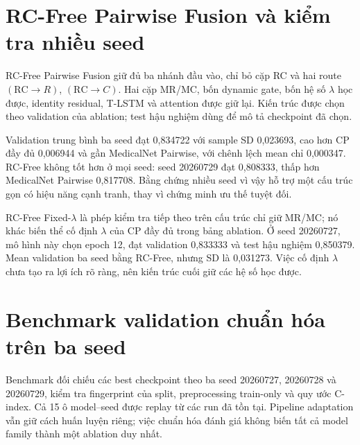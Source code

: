 \FloatBarrier
\section{RC-Free Pairwise Fusion và kiểm tra nhiều seed}
\label{sec:rcfree-multiseed}
RC-Free Pairwise Fusion giữ đủ ba nhánh đầu vào, chỉ bỏ cặp RC và hai route $(\mathrm{RC}\to R)$, $(\mathrm{RC}\to C)$. Hai cặp MR/MC, bốn dynamic gate, bốn hệ số $\lambda$ học được, identity residual, T-LSTM và attention được giữ lại. Kiến trúc được chọn theo validation của ablation; test hậu nghiệm dùng để mô tả checkpoint đã chọn.

Validation trung bình ba seed đạt 0,834722 với sample SD 0,023693, cao hơn CP đầy đủ 0,006944 và gần MedicalNet Pairwise, với chênh lệch mean chỉ 0,000347. RC-Free không tốt hơn ở mọi seed: seed 20260729 đạt 0,808333, thấp hơn MedicalNet Pairwise 0,817708. Bằng chứng nhiều seed vì vậy hỗ trợ một cấu trúc gọn có hiệu năng cạnh tranh, thay vì chứng minh ưu thế tuyệt đối.

RC-Free Fixed-$\lambda$ là phép kiểm tra tiếp theo trên cấu trúc chỉ giữ MR/MC; nó khác biến thể cố định $\lambda$ của CP đầy đủ trong bảng ablation. Ở seed 20260727, mô hình này chọn epoch 12, đạt validation 0,833333 và test hậu nghiệm 0,850379. Mean validation ba seed bằng RC-Free, nhưng SD là 0,031273. Việc cố định $\lambda$ chưa tạo ra lợi ích rõ ràng, nên kiến trúc cuối giữ các hệ số học được.

\section{Benchmark validation chuẩn hóa trên ba seed}
\label{sec:standardized-benchmark}
Benchmark đối chiếu các best checkpoint theo ba seed 20260727, 20260728 và 20260729, kiểm tra fingerprint của split, preprocessing train-only và quy ước C-index. Cả 15 ô model--seed được replay từ các run đã tồn tại. Pipeline adaptation vẫn giữ cách huấn luyện riêng; việc chuẩn hóa đánh giá không biến tất cả model family thành một ablation duy nhất.


